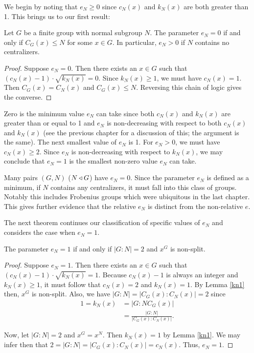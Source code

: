 \documentclass[main.tex]{subfiles}
\begin{document}
We begin by noting that $e_N \ge 0$ since $c_N(x)$ and $k_N(x)$ are both greater than 1. This brings us to our first result:

\begin{theorem}\label{en0}
Let $G$ be a finite group with normal subgroup $N$. The parameter $e_N = 0$ if and only if $C_G(x) \le N$ for some $x \in G$. In particular, $e_N > 0$ if $N$ contains no centralizers.
\end{theorem}

\begin{proof}
Suppose $e_N = 0$. Then there exists an $x \in G$ such that $(c_N(x) - 1) \cdot \sqrt{k_N(x)} = 0$. Since $k_N(x) \ge 1$, we must have $c_N(x) = 1$. Then $C_G(x) = C_N(x)$ and $C_G(x) \le N$. Reversing this chain of logic gives the converse.
\end{proof}

Zero is the minimum value $e_N$ can take since both $c_N(x)$ and $k_N(x)$ are greater than or equal to 1 and $e_N$ is non-decreasing with respect to both $c_N(x)$ and $k_N(x)$ (see the previous chapter for a discussion of this; the argument is the same). The next smallest value of $e_N$ is 1. For $e_N > 0$, we must have $c_N(x) \ge 2$. Since $e_N$ is non-decreasing with respect to $k_N(x)$, we may conclude that $e_N = 1$ is the smallest non-zero value $e_N$ can take.

Many pairs $(G, N)$  ($N \triangleleft G$) have $e_N = 0$. Since the parameter $e_N$ is defined as a minimum, if $N$ contains any centralizers, it must fall into this class of groups. Notably this includes Frobenius groups which were ubiquitous in the last chapter. This gives further evidence that the relative $e_N$ is distinct from the non-relative $e$.

The next theorem continues our classification of specific values of $e_N$ and considers the case when $e_N = 1$.

\begin{theorem}\label{en1}
The parameter $e_N = 1$ if and only if $|G:N| = 2$ and $x^G$ is non-split.
\end{theorem}

\begin{proof}
Suppose $e_N = 1$. Then there exists an $x \in G$ such that $(c_N(x) - 1) \cdot \sqrt{k_N(x)} = 1$. Because $c_N(x) - 1$ is always an integer and $k_N(x) \ge 1$, it must follow that $c_N(x) = 2$ and $k_N(x) = 1$. By Lemma \ref{kn1} then, $x^G$ is non-split. Also, we have $|G : N| = |C_G(x) : C_N(x)| = 2$ since
\begin{align*}
1 = k_N(x) &= |G : NC_G(x)| \\
&= \frac{|G : N|}{|C_G(x) : C_N(x)|} \text{.}
\end{align*}

Now, let $|G:N| = 2$ and $x^G = x^N$. Then $k_N(x) = 1$ by Lemma \ref{kn1}. We may infer then that $2 = |G : N| = |C_G(x) : C_N(x)| = c_N(x)$. Thus, $e_N = 1$. 
\end{proof}
\end{document}
